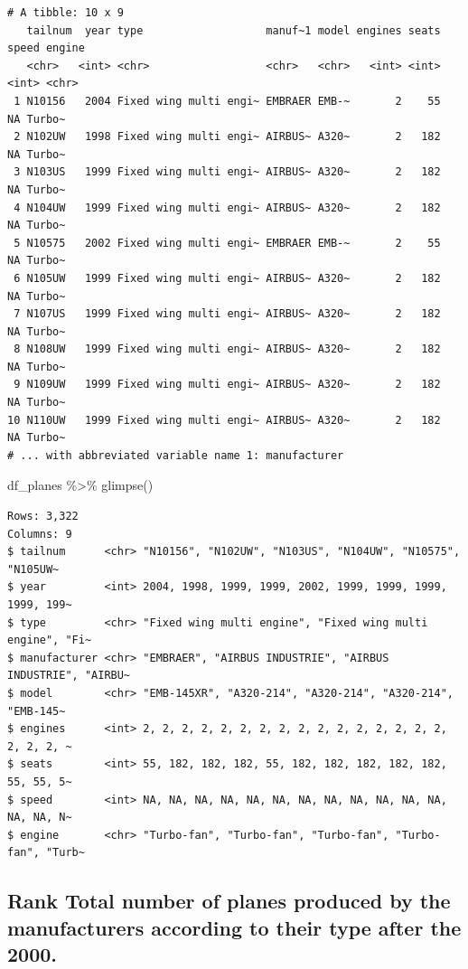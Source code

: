 \documentclass[
  letterpaper,
  DIV=11,
  numbers=noendperiod]{scrreprt}
\newenvironment{Shaded}{\begin{snugshade}}{\end{snugshade}}
\newcommand{\FunctionTok}[1]{\textcolor[rgb]{0.28,0.35,0.67}{#1}}
\newcommand{\NormalTok}[1]{\textcolor[rgb]{0.00,0.23,0.31}{#1}}
\newcommand{\SpecialCharTok}[1]{\textcolor[rgb]{0.37,0.37,0.37}{#1}}
\begin{document}
\begin{verbatim}
# A tibble: 10 x 9
   tailnum  year type                   manuf~1 model engines seats speed engine
   <chr>   <int> <chr>                  <chr>   <chr>   <int> <int> <int> <chr> 
 1 N10156   2004 Fixed wing multi engi~ EMBRAER EMB-~       2    55    NA Turbo~
 2 N102UW   1998 Fixed wing multi engi~ AIRBUS~ A320~       2   182    NA Turbo~
 3 N103US   1999 Fixed wing multi engi~ AIRBUS~ A320~       2   182    NA Turbo~
 4 N104UW   1999 Fixed wing multi engi~ AIRBUS~ A320~       2   182    NA Turbo~
 5 N10575   2002 Fixed wing multi engi~ EMBRAER EMB-~       2    55    NA Turbo~
 6 N105UW   1999 Fixed wing multi engi~ AIRBUS~ A320~       2   182    NA Turbo~
 7 N107US   1999 Fixed wing multi engi~ AIRBUS~ A320~       2   182    NA Turbo~
 8 N108UW   1999 Fixed wing multi engi~ AIRBUS~ A320~       2   182    NA Turbo~
 9 N109UW   1999 Fixed wing multi engi~ AIRBUS~ A320~       2   182    NA Turbo~
10 N110UW   1999 Fixed wing multi engi~ AIRBUS~ A320~       2   182    NA Turbo~
# ... with abbreviated variable name 1: manufacturer
\end{verbatim}

\begin{Shaded}
\begin{Highlighting}[]
\NormalTok{df\_planes }\SpecialCharTok{\%\textgreater{}\%}  \FunctionTok{glimpse}\NormalTok{()}
\end{Highlighting}
\end{Shaded}

\begin{verbatim}
Rows: 3,322
Columns: 9
$ tailnum      <chr> "N10156", "N102UW", "N103US", "N104UW", "N10575", "N105UW~
$ year         <int> 2004, 1998, 1999, 1999, 2002, 1999, 1999, 1999, 1999, 199~
$ type         <chr> "Fixed wing multi engine", "Fixed wing multi engine", "Fi~
$ manufacturer <chr> "EMBRAER", "AIRBUS INDUSTRIE", "AIRBUS INDUSTRIE", "AIRBU~
$ model        <chr> "EMB-145XR", "A320-214", "A320-214", "A320-214", "EMB-145~
$ engines      <int> 2, 2, 2, 2, 2, 2, 2, 2, 2, 2, 2, 2, 2, 2, 2, 2, 2, 2, 2, ~
$ seats        <int> 55, 182, 182, 182, 55, 182, 182, 182, 182, 182, 55, 55, 5~
$ speed        <int> NA, NA, NA, NA, NA, NA, NA, NA, NA, NA, NA, NA, NA, NA, N~
$ engine       <chr> "Turbo-fan", "Turbo-fan", "Turbo-fan", "Turbo-fan", "Turb~
\end{verbatim}

\hypertarget{rank-total-number-of-planes-produced-by-the-manufacturers-according-to-their-type-after-the-2000.}{%
\subsection{Rank Total number of planes produced by the manufacturers
according to their type after the
2000.}\label{rank-total-number-of-planes-produced-by-the-manufacturers-according-to-their-type-after-the-2000.}}
\end{document}

